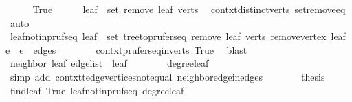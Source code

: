 \begin{isabellebody}
\ \ \ \ \isamarkupfalse%
\ True\isanewline
\ \ \ \ \isamarkupfalse%
\ {\isachardoublequoteopen}leaf\ {\isasymnotin}\ set\ {\isacharparenleft}{\kern0pt}remove{}\ leaf\ verts{\isacharparenright}{\kern0pt}{\isachardoublequoteclose}\ \isamarkupfalse%
\ contxt{\isachardot}{\kern0pt}distinct{\isacharunderscore}{\kern0pt}verts\ set{\isacharunderscore}{\kern0pt}remove{}{\isacharunderscore}{\kern0pt}eq\ \isamarkupfalse%
\ auto\isanewline
\ \ \ \ \isamarkupfalse%
\ \isamarkupfalse%
\ leaf{\isacharunderscore}{\kern0pt}notin{\isacharunderscore}{\kern0pt}pruf{\isacharunderscore}{\kern0pt}seq{\isacharprime}{\kern0pt}{\isacharcolon}{\kern0pt}\ {\isachardoublequoteopen}leaf\ {\isasymnotin}\ set\ {\isacharparenleft}{\kern0pt}tree{\isacharunderscore}{\kern0pt}to{\isacharunderscore}{\kern0pt}prufer{\isacharunderscore}{\kern0pt}seq\ {\isacharparenleft}{\kern0pt}remove{}\ leaf\ verts{\isacharparenright}{\kern0pt}\ {\isacharparenleft}{\kern0pt}remove{\isacharunderscore}{\kern0pt}vertex\ leaf\ {\isacharparenleft}{\kern0pt}e{}\ {\isacharhash}{\kern0pt}\ e{}\ {\isacharhash}{\kern0pt}\ edges{\isacharparenright}{\kern0pt}{\isacharparenright}{\kern0pt}{\isacharparenright}{\kern0pt}{\isachardoublequoteclose}\isanewline
\ \ \ \ \ \ \isamarkupfalse%
\ contxt{\isacharprime}{\kern0pt}{\isachardot}{\kern0pt}prufer{\isacharunderscore}{\kern0pt}seq{\isacharunderscore}{\kern0pt}in{\isacharunderscore}{\kern0pt}verts\ True\ \isamarkupfalse%
\ blast\isanewline
\isanewline
\ \ \ \ \isamarkupfalse%
\ {\isachardoublequoteopen}neighbor\ leaf\ {\isacharquery}{\kern0pt}edge{\isacharunderscore}{\kern0pt}list\ {\isasymnoteq}\ leaf{\isachardoublequoteclose}\isanewline
\ \ \ \ \ \ \isamarkupfalse%
\ degree{\isacharunderscore}{\kern0pt}leaf\ \isamarkupfalse%
\ {\isacharparenleft}{\kern0pt}simp\ add{\isacharcolon}{\kern0pt}\ contxt{\isachardot}{\kern0pt}t{\isachardot}{\kern0pt}edge{\isacharunderscore}{\kern0pt}vertices{\isacharunderscore}{\kern0pt}not{\isacharunderscore}{\kern0pt}equal\ neighbor{\isacharunderscore}{\kern0pt}edge{\isacharunderscore}{\kern0pt}in{\isacharunderscore}{\kern0pt}edges{\isacharparenright}{\kern0pt}\isanewline
\ \ \ \ \isamarkupfalse%
\ \isamarkupfalse%
\ {\isacharquery}{\kern0pt}thesis\ \isamarkupfalse%
\ find{\isacharunderscore}{\kern0pt}leaf\ True\ leaf{\isacharunderscore}{\kern0pt}notin{\isacharunderscore}{\kern0pt}pruf{\isacharunderscore}{\kern0pt}seq{\isacharprime}{\kern0pt}\ degree{\isacharunderscore}{\kern0pt}leaf\ \isamarkupfalse%

\end{isabellebody}
